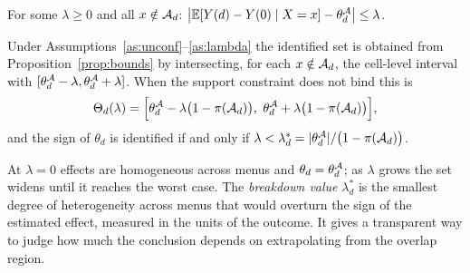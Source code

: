 \begin{assumption}\label{as:lambda}
For some $\lambda\ge0$ and all $x\notin\mathcal{A}_d$: $\bigl|\operatorname{\mathbb{E}}[Y(d)-Y(0)\mid X=x]-\theta_d^{\mathcal{A}}\bigr|\le\lambda$.
\end{assumption}

\begin{proposition}\label{prop:lambda}
Under Assumptions~\ref{as:unconf}--\ref{as:lambda} the identified set is obtained from Proposition~\ref{prop:bounds}
by intersecting, for each $x\notin\mathcal{A}_d$, the cell-level interval with $[\theta^{\mathcal{A}}_d-\lambda,\theta^{\mathcal{A}}_d+\lambda]$.
When the support constraint does not bind this is
\[
\Theta_d(\lambda)=\Bigl[\theta_d^{\cA}-\lambda\bigl(1-\pi(\cA_d)\bigr),\ \theta_d^{\cA}+\lambda\bigl(1-\pi(\cA_d)\bigr)\Bigr],
\]
and the sign of $\theta_d$ is identified if and only if $\lambda<\lambda^\ast_d=|\theta_d^{\mathcal{A}}|/\bigl(1-\pi(\mathcal{A}_d)\bigr)$.
\end{proposition}

At $\lambda=0$ effects are homogeneous across menus and $\theta_d=\theta_d^{\mathcal{A}}$; as $\lambda$ grows the set
widens until it reaches the worst case. The \emph{breakdown value} $\lambda^\ast_d$ is the smallest degree of
heterogeneity across menus that would overturn the sign of the estimated effect, measured in the units of the
outcome. It gives a transparent way to judge how much the conclusion depends on extrapolating from the overlap
region.

